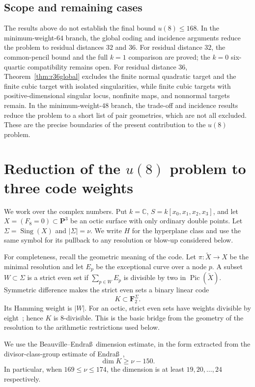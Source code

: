 \documentclass[11pt,reqno]{amsart}
\theoremstyle{remark}
\newcommand{\F}{\mathbf F}
\newcommand{\PP}{\mathbf P}
\begin{document}
\subsection{Scope and remaining cases}
The results above do not establish the final bound $u(8)\le168$.  In the minimum-weight-$64$ branch, the global coding and incidence arguments reduce the problem to residual distances $32$ and $36$.  For residual distance $32$, the common-pencil bound and the full $k=1$ comparison are proved; the $k=0$ six-quartic compatibility remains open.  For residual distance $36$, Theorem~\ref{thm:r36global} excludes the finite normal quadratic target and the finite cubic target with isolated singularities, while finite cubic targets with positive-dimensional singular locus, nonfinite maps, and nonnormal targets remain.  In the minimum-weight-$48$ branch, the trade-off and incidence results reduce the problem to a short list of pair geometries, which are not all excluded.  These are the precise boundaries of the present contribution to the $u(8)$ problem.

\section{Reduction of the \texorpdfstring{$u(8)$}{u(8)} problem to three code weights}\label{sec:codes}
We work over the complex numbers.  Put $k=\mathbb C$, $S=k[x_0,x_1,x_2,x_3]$, and let $X=(F_8=0)\subset\PP^3$ be an octic surface with only ordinary double points.  Let $\Sigma=\operatorname{Sing}(X)$ and $|\Sigma|=\nu$.  We write $H$ for the hyperplane class and use the same symbol for its pullback to any resolution or blow-up considered below.

For completeness, recall the geometric meaning of the code.  Let $\pi:\widetilde X\to X$ be the minimal resolution and let $E_p$ be the exceptional curve over a node $p$.  A subset $W\subset\Sigma$ is a strict even set if $\sum_{p\in W}E_p$ is divisible by two in $\operatorname{Pic}(\widetilde X)$.  Symmetric difference makes the strict even sets a binary linear code
\[
K\subset\F_2^\Sigma.
\]
Its Hamming weight is $|W|$.  For an octic, strict even sets have weights divisible by eight~\cite{EndrassMinimal}; hence $K$ is $8$-divisible.  This is the basic bridge from the geometry of the resolution to the arithmetic restrictions used below.

We use the Beauville--Endra\ss\ dimension estimate, in the form extracted from the divisor-class-group estimate of Endra\ss~\cite{EndrassDouble},
\[
\dim K\ge\nu-150.
\]
In particular, when $169\le\nu\le174$, the dimension is at least $19,20,\ldots,24$ respectively.
\end{document}
